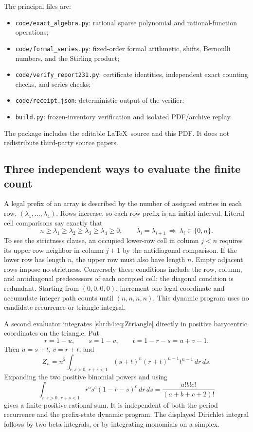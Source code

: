 \documentclass[11pt,letterpaper]{article}
\numberwithin{equation}{section}
\theoremstyle{definition}
\newcommand{\1}{\mathbf 1}
\newcommand{\dd}{\,d}
\begin{document}
The principal files are:
\begin{itemize}
\item \texttt{code/exact\_algebra.py}: rational sparse polynomial and
      rational-function operations;
\item \texttt{code/formal\_series.py}: fixed-order formal arithmetic,
      shifts, Bernoulli numbers, and the Stirling product;
\item \texttt{code/verify\_report231.py}: certificate identities,
      independent exact counting checks, and series checks;
\item \texttt{code/receipt.json}: deterministic output of the verifier;
\item \texttt{build.py}: frozen-inventory verification and isolated
      PDF/archive replay.
\end{itemize}
The package includes the editable \LaTeX\ source and this PDF. It does
not redistribute third-party source papers.

\subsection{Three independent ways to evaluate the finite count}
A legal prefix of an array is described by the number of assigned entries
in each row, $(\lambda_1,\ldots,\lambda_4)$. Rows increase, so each row
prefix is an initial interval. Literal cell comparisons say exactly that
\begin{equation}
 n\ge\lambda_1\ge\lambda_2\ge\lambda_3\ge\lambda_4\ge0,
 \qquad
 \lambda_i=\lambda_{i+1}\ \Longrightarrow\
 \lambda_i\in\{0,n\}.
 \label{shr:h4:eq:prefix}
\end{equation}
To see the strictness clause, an occupied lower-row cell in column $j<n$
requires its upper-row neighbor in column $j+1$ by the antidiagonal
comparison. If the lower row has length $n$, the upper row must also
have length $n$. Empty adjacent rows impose no strictness. Conversely
these conditions include the row, column, and antidiagonal predecessors
of each occupied cell; the diagonal condition is redundant.
Starting from $(0,0,0,0)$, increment one legal coordinate and accumulate
integer path counts until $(n,n,n,n)$. This dynamic program uses no
candidate recurrence or triangle integral.

A second evaluator integrates \eqref{shr:h4:eq:Ztriangle} directly in positive
barycentric coordinates on the triangle. Put
\[
 r=1-u,\qquad s=1-v,\qquad t=1-r-s=u+v-1.
\]
Then $u=s+t$, $v=r+t$, and
\[
 Z_n=n^2\int_{r,s>0,\ r+s<1}(s+t)^n(r+t)^{n-1}t^{n-1}\dd r\dd s.
\]
Expanding the two positive binomial powers and using
\[
 \int_{r,s>0,\ r+s<1}r^a s^b(1-r-s)^c\dd r\dd s
 =\frac{a!b!c!}{(a+b+c+2)!}
\]
gives a finite positive rational sum. It is independent of both the
period recurrence and the prefix-state dynamic program. The displayed
Dirichlet integral follows by two beta integrals, or by integrating
monomials on a simplex.
\end{document}
